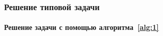 \documentclass[ignorenonframetext,hyperref={pdftex,unicode},compress]{beamer}
\begin{document}
\begin{frame}
	\frametitle{Решение типовой задачи}
	\framesubtitle{Решение задачи с помощью алгоритма~\ref{alg:1}}
    
    \begin{figure}\center
        
        \label{fig:alg1}
    \end{figure}
\end{frame}
\end{document}
